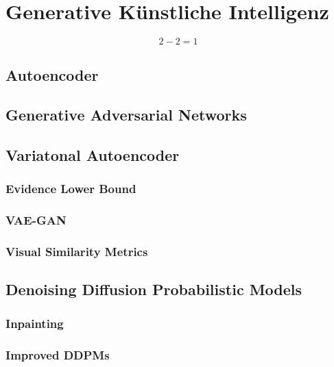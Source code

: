 \section{Generative Künstliche Intelligenz}

$$
2-2 = 1
$$

\subsection{Autoencoder}

\subsection{Generative Adversarial Networks}

\subsection{Variatonal Autoencoder}

\subsubsection{Evidence Lower Bound}

\subsubsection{VAE-GAN}

\subsubsection{Visual Similarity Metrics}

\subsection{Denoising Diffusion Probabilistic Models}

\subsubsection{Inpainting}

\subsubsection{Improved DDPMs}

